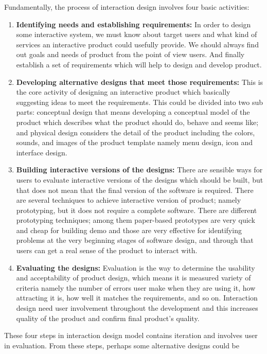 Fundamentally, the process of interaction design \cite{preece2002interaction} involves four basic
activities:
\begin{enumerate}
\item \textbf{Identifying needs and establishing requirements:} In order to
design some interactive system, we must know about target users and what kind of
services an interactive product could usefully provide.
We should always find out goals and needs of product from the point of view
users. And finally establish a set of requirements which will help to design and
develop product.
\item \textbf{Developing alternative designs that meet those requirements:} This
is the core activity of designing an interactive product which basically suggesting
ideas to meet the requirements. This could  be divided into two sub parts:
conceptual design that means  developing a conceptual model of the product which
describes what the product should do, behave and seems like; and physical design
considers the detail of the product including the colors, sounds, and images of
the product template namely  menu design, icon and interface design.
\item \textbf{Building interactive versions of the designs:} There are sensible
ways for users to evaluate interactive versions of the designs which should be
built, but that does not mean that the final version of the software is required.
There are several techniques to achieve interactive version of product; namely
prototyping, but it does not require a complete software. There are different
prototyping techniques; among them paper-based prototypes are very quick and
cheap for building demo and those are very effective for identifying problems at
the very beginning stages of software design, and through  that  users can get a
real sense of  the product to interact with.
\item \textbf{Evaluating the designs:} Evaluation is the way to determine the
usability and acceptability of product design, which means it is measured
variety of criteria namely the number of errors user make when they are using
it, how attracting it is, how well it matches the requirements, and so on.
Interaction design need  user involvement throughout the development and this
increases quality of the product and confirm final product's quality.
\end{enumerate}
These four steps in interaction design model contains iteration and involves
user in evaluation. From these steps, perhaps some alternative designs could be
